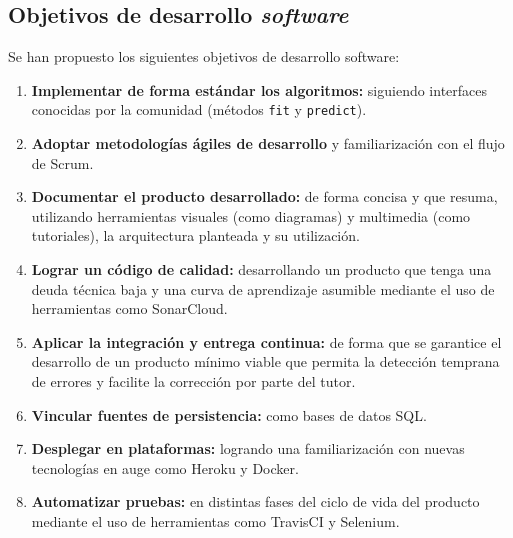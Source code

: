 \subsection{Objetivos de desarrollo \textit{software}}
\label{Objetivos de desarrollo}

Se han propuesto los siguientes objetivos de desarrollo software:

\begin{enumerate}
	\item \textbf{Implementar de forma estándar los algoritmos:} siguiendo interfaces conocidas por la comunidad (métodos \texttt{fit} y \texttt{predict}).
	\item \textbf{Adoptar metodologías ágiles de desarrollo} y familiarización con el flujo de Scrum.
	\item \textbf{Documentar el producto desarrollado:} de forma concisa y que resuma, utilizando herramientas visuales (como diagramas) y multimedia (como tutoriales), la arquitectura planteada y su utilización.
	\item \textbf{Lograr un código de calidad:} desarrollando un producto que tenga una deuda técnica baja y una curva de aprendizaje asumible mediante el uso de herramientas como SonarCloud.
	\item \textbf{Aplicar la integración y entrega continua:} de forma que se garantice el desarrollo de un producto mínimo viable que permita la detección temprana de errores y facilite la corrección por parte del tutor.
	\item \textbf{Vincular fuentes de persistencia:} como bases de datos SQL.
	\item \textbf{Desplegar en plataformas:} logrando una familiarización con nuevas tecnologías en auge como Heroku y Docker.
	\item \textbf{Automatizar pruebas:} en distintas fases del ciclo de vida del producto mediante el uso de herramientas como TravisCI y Selenium.
	
\end{enumerate}